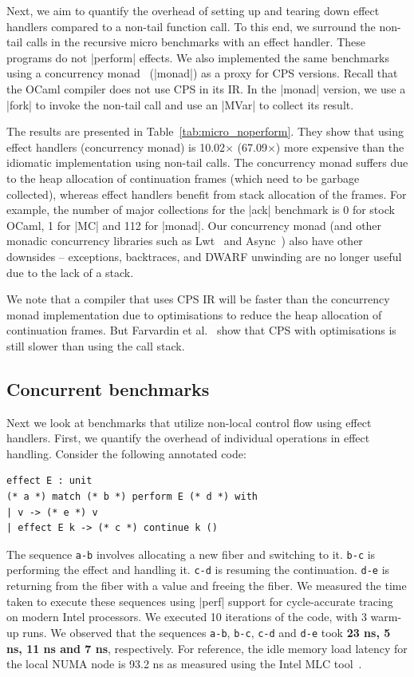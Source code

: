 \documentclass[sigplan,screen]{acmart}
\begin{document}
Next, we aim to quantify the overhead of setting up and tearing down effect
handlers compared to a non-tail function call. To this end, we surround the
non-tail calls in the recursive micro benchmarks with an effect handler. These
programs do not |perform| effects. We also implemented the same benchmarks using
a concurrency monad~\cite{Claessen99} (|monad|) as a proxy for CPS versions.
Recall that the OCaml compiler does not use CPS in its IR. In the |monad|
version, we use a |fork| to invoke the non-tail call and use an |MVar| to
collect its result.

The results are presented in Table~\ref{tab:micro_noperform}. They show that
using effect handlers (concurrency monad) is 10.02$\times$ (67.09$\times$) more
expensive than the idiomatic implementation using non-tail calls. The
concurrency monad suffers due to the heap allocation of continuation frames
(which need to be garbage collected), whereas effect handlers benefit from
stack allocation of the frames. For example, the number of major collections
for the |ack| benchmark is 0 for stock OCaml, 1 for |MC| and 112 for |monad|.
Our concurrency monad (and other monadic concurrency libraries such as
Lwt~\cite{lwt} and Async~\cite{async}) also have other downsides -- exceptions,
backtraces, and DWARF unwinding are no longer useful due to the lack of a
stack.

We note that a compiler that uses CPS IR will be faster than the concurrency
monad implementation due to optimisations to reduce the heap allocation of
continuation frames. But Farvardin et al.~\cite{Farvardin20} show that CPS with
optimisations is still slower than using the call stack.

\subsection{Concurrent benchmarks}

Next we look at benchmarks that utilize non-local control flow using effect
handlers. First, we quantify the overhead of individual operations in effect
handling. Consider the following annotated code:
\begin{lstlisting}
effect E : unit
(* a *) match (* b *) perform E (* d *) with
| v -> (* e *) v
| effect E k -> (* c *) continue k ()
\end{lstlisting}
The sequence \texttt{a-b} involves allocating a new fiber and switching to it.
\texttt{b-c} is performing the effect and handling it. \texttt{c-d} is resuming
the continuation. \texttt{d-e} is returning from the fiber with a value and
freeing the fiber. We measured the time taken to execute these sequences using
|perf| support for cycle-accurate tracing on modern Intel processors. We
executed 10 iterations of the code, with 3 warm-up runs. We observed that the
sequences \texttt{a-b}, \texttt{b-c}, \texttt{c-d} and \texttt{d-e} took
\textbf{23 ns, 5 ns, 11 ns and 7 ns}, respectively. For reference, the idle
memory load latency for the local NUMA node is 93.2 ns as measured using the
Intel MLC tool~\cite{mlc}.
\end{document}
